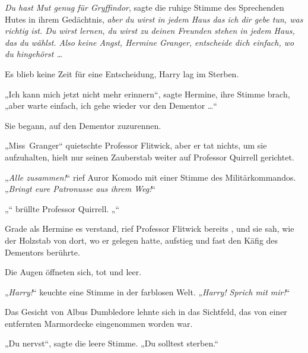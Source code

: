 \emph{Du hast Mut genug für Gryffindor}, sagte die ruhige Stimme des Sprechenden Hutes in ihrem Gedächtnis, \emph{aber du wirst in jedem Haus das ich dir gebe tun, was richtig ist. Du wirst lernen, du wirst zu deinen Freunden stehen in jedem Haus, das du wählst. Also keine Angst, Hermine Granger, entscheide dich einfach, wo du hingehörst …}

Es blieb keine Zeit für eine Entscheidung, Harry lag im Sterben.

„Ich kann mich jetzt nicht mehr erinnern“, sagte Hermine, ihre Stimme brach, „aber warte einfach, ich gehe wieder vor den Dementor …“

Sie begann, auf den Dementor zuzurennen.

„Miss~Granger“ quietschte Professor Flitwick, aber er tat nichts, um sie aufzuhalten, hielt nur seinen Zauberstab weiter auf Professor Quirrell gerichtet.

„\emph{Alle zusammen!}“ rief Auror Komodo mit einer Stimme des Militärkommandos.
„\emph{Bringt eure Patronusse aus ihrem Weg!}“

„“ brüllte Professor Quirrell. „“

Grade als Hermine es verstand, rief Professor Flitwick bereits , und sie sah, wie der Holzstab von dort, wo er gelegen hatte, aufstieg und fast den Käfig des Dementors berührte.

\later

Die Augen öffneten sich, tot und leer.

„\emph{Harry!}“ keuchte eine Stimme in der farblosen Welt.
„\emph{Harry! Sprich mit mir!}“

Das Gesicht von Albus Dumbledore lehnte sich in das Sichtfeld, das von einer entfernten Marmordecke eingenommen worden war.

„Du nervst“, sagte die leere Stimme.
„Du solltest sterben.“

